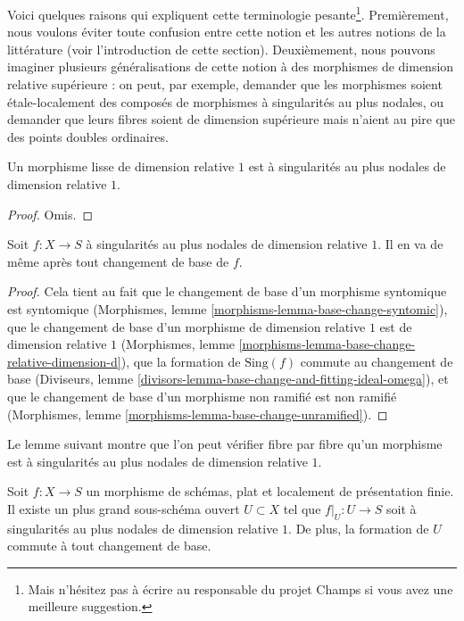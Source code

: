\noindent
Voici quelques raisons qui expliquent cette terminologie pesante\footnote{Mais n'hésitez pas à écrire au responsable du projet Champs si vous avez une meilleure suggestion.}. Premièrement, nous voulons éviter toute confusion entre cette notion et les autres notions de la littérature (voir l'introduction de cette section). Deuxièmement, nous pouvons imaginer plusieurs généralisations de cette notion à des morphismes de dimension relative supérieure : on peut, par exemple, demander que les morphismes soient étale-localement des composés de morphismes à singularités au plus nodales, ou demander que leurs fibres soient de dimension supérieure mais n'aient au pire que des points doubles ordinaires.

\begin{lemma}
\label{lemma-smooth-relative-dimension-1}
Un morphisme lisse de dimension relative $1$ est à singularités au plus nodales de dimension relative $1$.
\end{lemma}

\begin{proof}
Omis.
\end{proof}

\begin{lemma}
\label{lemma-base-change-nodal-family}
Soit $f : X \to S$ à singularités au plus nodales de dimension relative $1$. Il en va de même après tout changement de base de $f$.
\end{lemma}

\begin{proof}
Cela tient au fait que le changement de base d'un morphisme syntomique est syntomique (Morphismes, lemme \ref{morphisms-lemma-base-change-syntomic}), que le changement de base d'un morphisme de dimension relative $1$ est de dimension relative $1$ (Morphismes, lemme \ref{morphisms-lemma-base-change-relative-dimension-d}), que la formation de $\text{Sing}(f)$ commute au changement de base (Diviseurs, lemme \ref{divisors-lemma-base-change-and-fitting-ideal-omega}), et que le changement de base d'un morphisme non ramifié est non ramifié (Morphismes, lemme \ref{morphisms-lemma-base-change-unramified}).
\end{proof}

\noindent
Le lemme suivant montre que l'on peut vérifier fibre par fibre qu'un morphisme est à singularités au plus nodales de dimension relative $1$.

\begin{lemma}
\label{lemma-locus-where-nodal}
Soit $f : X \to S$ un morphisme de schémas, plat et localement de présentation finie. Il existe un plus grand sous-schéma ouvert $U \subset X$ tel que $f|_U : U \to S$ soit à singularités au plus nodales de dimension relative $1$. De plus, la formation de $U$ commute à tout changement de base.
\end{lemma}


